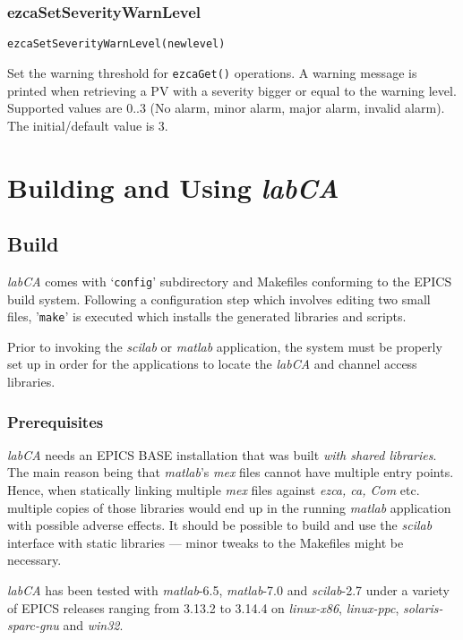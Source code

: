 \documentclass{article}
\newcommand{\sca}{\ita{labCA}}
\newcommand{\scilab}{\ita{scilab}}
\newcommand{\matlab}{\ita{matlab}}
\newcommand{\windoze}{\ita{win32}}
\newcommand{\com}[1]{{\tt #1}}
\newcommand{\ita}[1]{\emph{#1}}
\newcommand{\sevrange}{$0..3$}
\renewcommand{\sevrange}{0..3}
\begin{document}
\subsubsection{ezcaSetSeverityWarnLevel}
\label{swarnlevel}
\begin{verbatim}
ezcaSetSeverityWarnLevel(newlevel)
\end{verbatim}
Set the warning threshold for \com{ezcaGet()} operations.
A warning message is printed when retrieving a PV with a severity bigger
or equal to the warning level. Supported values are \sevrange{} (No alarm,
minor alarm, major alarm, invalid alarm). The initial/default value is 3.

\section{Building and Using \sca{}}
\subsection{Build}
\sca{} comes with `\com{config}' subdirectory and Makefiles conforming to the
EPICS build system. Following a configuration step which involves editing
two small files, '\com{make}' is executed which installs the generated libraries
and scripts.

Prior to invoking the \scilab{} or \matlab{} application, the system
must be properly set up in order for the applications to locate the
\sca{} and channel access libraries.

\subsubsection{Prerequisites}
\sca{} needs an EPICS BASE installation that was built \ita{with shared
libraries}. The main reason being that \matlab's \ita{mex} files cannot
have multiple entry points. Hence, when statically linking multiple \ita{mex}
files against \ita{ezca, ca, Com} etc. multiple copies of those libraries
would end up in the running \matlab{} application with possible adverse
effects. It should be possible to build and use the \scilab{} interface
with static libraries --- minor tweaks to the Makefiles might be necessary.

\sca{} has been tested with \matlab-6.5, \matlab-7.0 and \scilab-2.7
under a variety of EPICS releases ranging from 3.13.2
to 3.14.4 on \ita{linux-x86}, \ita{linux-ppc}, \ita{solaris-sparc-gnu}
and \windoze.
\end{document}

